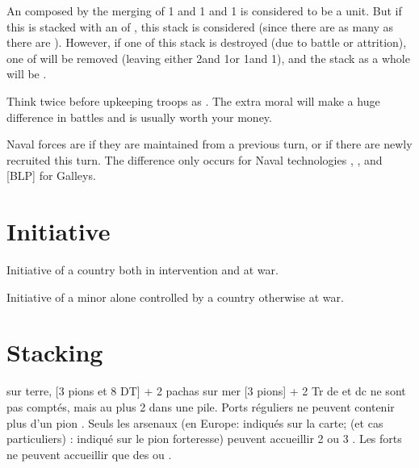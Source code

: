
\begin{exemple}
  An \ARMY\faceplus composed by the merging of 1  \LD and 1
   \ARMY\facemoins and 1  \LD is considered to
  be a  unit. But if this \ARMY\faceplus is stacked with an
  \ARMY\facemoins of , this stack is considered
   (since there are as many  as there are
  ). However, if one \LD of this stack is destroyed (due to
  battle or attrition), one \LD of  will be removed (leaving
  either 2\ARMY\facemoins and 1\LD or 1\ARMY\faceplus and 1\LD), and the stack
  as a whole will be .
\end{exemple}

\begin{playtip}
  Think twice before upkeeping troops as . The extra moral
  will make a huge difference in battles and is usually worth your money.
\end{playtip}

\aparag[Navy] Naval forces are  if they are maintained from a
previous turn, or  if there are newly recruited this turn.
\bparag The difference only occurs for Naval technologies ,
, and [BLP] for \TUR Galleys.


\section{Initiative}
Initiative of a country both in intervention and at war.

Initiative of a minor alone controlled by a country otherwise at war.

\section{Stacking}\label{chMilitary:Stacking}
\aparag[Empilement]
\bparag sur terre, [3 pions et 8 DT] + 2 pachas
\bparag  sur mer [3 pions] + 2 Tr
\bparag de et dc ne sont pas comptés, mais au plus 2 dans une pile.
 Ports réguliers ne peuvent contenir plus d'un pion
\FLEET.  Seuls les arsenaux (en Europe: indiqués sur la carte; \ROTW (et cas
particuliers) : indiqué sur le pion forteresse) peuvent accueillir 2 ou 3
\FLEET.  Les forts ne peuvent accueillir que des \DN ou \NDE.

